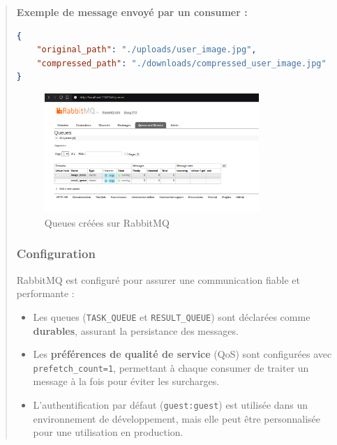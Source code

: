 \documentclass[12pt]{article}
\begin{document}
\begin{quote}
\begin{itemize}
\begin{itemize}
        \textbf{Exemple de message envoyé par un consumer :} 
        \begin{lstlisting}[language=json]
{
    "original_path": "./uploads/user_image.jpg",
    "compressed_path": "./downloads/compressed_user_image.jpg"
}
        \end{lstlisting}
    \end{itemize}
\end{itemize}

\begin{figure}[h!]
    \centering
    \includegraphics[width=0.8\textwidth]{queues.png}
    \caption{Queues créées sur RabbitMQ}
    \label{fig:rabbitmq}
\end{figure}


\subsubsection*{Configuration}
RabbitMQ est configuré pour assurer une communication fiable et performante :
\begin{itemize}
    \item Les queues (\texttt{TASK\_QUEUE} et \texttt{RESULT\_QUEUE}) sont déclarées comme \textbf{durables}, assurant la persistance des messages.
    \item Les \textbf{préférences de qualité de service} (QoS) sont configurées avec \texttt{prefetch\_count=1}, permettant à chaque consumer de traiter un message à la fois pour éviter les surcharges.
    \item L'authentification par défaut (\texttt{guest:guest}) est utilisée dans un environnement de développement, mais elle peut être personnalisée pour une utilisation en production.
\end{itemize}


\end{quote}
\end{document}
